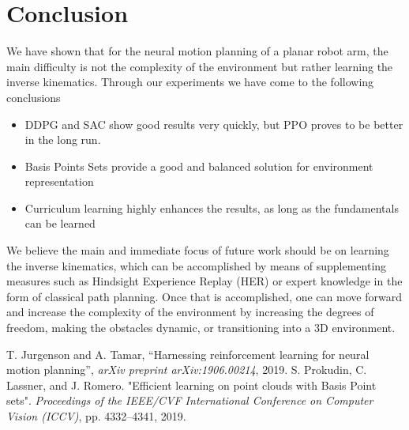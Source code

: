 \documentclass[conference]{IEEEtran}
\begin{document}
\section{Conclusion} 

We have shown that for the neural motion planning of a planar robot arm, the main difficulty is not the complexity of the environment but rather learning the inverse kinematics. Through our experiments we have come to the following conclusions
 \begin{itemize}
\item DDPG and SAC show good results very quickly, but PPO proves to be better in the long run.
\item Basis Points Sets provide a good and balanced solution for environment representation
\item Curriculum learning highly enhances the results, as long as the fundamentals can be learned
\end{itemize}
We believe the main and immediate focus of future work should be on learning the inverse kinematics, which can be accomplished by means of supplementing measures such as Hindsight Experience Replay (HER) or expert knowledge in the form of classical path planning. Once that is accomplished, one can move forward and increase the complexity of the environment by increasing the degrees of freedom, making the obstacles dynamic, or transitioning into a 3D environment.


\begin{thebibliography}{00}
 T. Jurgenson and A. Tamar, ``Harnessing reinforcement learning for neural
motion planning'',  \textit{arXiv preprint arXiv:1906.00214}, 2019.
 S. Prokudin, C. Lassner, and J. Romero. "Efficient learning on point clouds with Basis Point sets". \textit{Proceedings of the IEEE/CVF International Conference on Computer Vision (ICCV)}, pp. 4332–4341, 2019.
\end{thebibliography}
\end{document}
